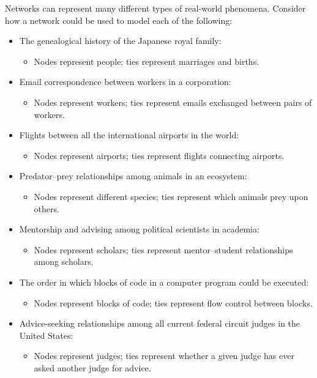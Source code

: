 \documentclass{book}
\providecommand{\tightlist}{%
  \setlength{\itemsep}{0pt}\setlength{\parskip}{0pt}}
\begin{document}
Networks can represent many different types of real-world phenomena. Consider
how a network could be used to model each of the following:

\begin{itemize}
\item
  The genealogical history of the Japanese royal family:

  \begin{itemize}
  \tightlist
  \item
    Nodes represent people; ties represent marriages and births.
  \end{itemize}
\item
  Email correspondence between workers in a corporation:

  \begin{itemize}
  \tightlist
  \item
    Nodes represent workers; ties represent emails exchanged between pairs of
    workers.
  \end{itemize}
\item
  Flights between all the international airports in the world:

  \begin{itemize}
  \tightlist
  \item
    Nodes represent airports; ties represent flights connecting airports.
  \end{itemize}
\item
  Predator--prey relationships among animals in an ecosystem:

  \begin{itemize}
  \tightlist
  \item
    Nodes represent different species; ties represent which animals prey upon
    others.
  \end{itemize}
\item
  Mentorship and advising among political scientists in academia:

  \begin{itemize}
  \tightlist
  \item
    Nodes represent scholars; ties represent mentor--student relationships
    among scholars.
  \end{itemize}
\item
  The order in which blocks of code in a computer program could be executed:

  \begin{itemize}
  \tightlist
  \item
    Nodes represent blocks of code; ties represent flow control between
    blocks.
  \end{itemize}
\item
  Advice-seeking relationships among all current federal circuit judges in the
  United States:

  \begin{itemize}
  \tightlist
  \item
    Nodes represent judges; ties represent whether a given judge has ever
    asked another judge for advice.
  \end{itemize}
\end{itemize}
\end{document}
